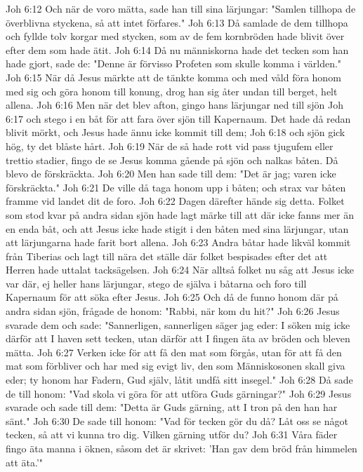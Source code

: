 Joh 6:12  Och när de voro mätta, sade han till sina lärjungar: "Samlen tillhopa de överblivna styckena, så att intet förfares."
Joh 6:13  Då samlade de dem tillhopa och fyllde tolv korgar med stycken, som av de fem kornbröden hade blivit över efter dem som hade ätit.
Joh 6:14  Då nu människorna hade det tecken som han hade gjort, sade de: "Denne är förvisso Profeten som skulle komma i världen."
Joh 6:15  När då Jesus märkte att de tänkte komma och med våld föra honom med sig och göra honom till konung, drog han sig åter undan till berget, helt allena.
Joh 6:16  Men när det blev afton, gingo hans lärjungar ned till sjön
Joh 6:17  och stego i en båt för att fara över sjön till Kapernaum. Det hade då redan blivit mörkt, och Jesus hade ännu icke kommit till dem;
Joh 6:18  och sjön gick hög, ty det blåste hårt.
Joh 6:19  När de så hade rott vid pass tjugufem eller trettio stadier, fingo de se Jesus komma gående på sjön och nalkas båten. Då blevo de förskräckta.
Joh 6:20  Men han sade till dem: "Det är jag; varen icke förskräckta."
Joh 6:21  De ville då taga honom upp i båten; och strax var båten framme vid landet dit de foro.
Joh 6:22  Dagen därefter hände sig detta. Folket som stod kvar på andra sidan sjön hade lagt märke till att där icke fanns mer än en enda båt, och att Jesus icke hade stigit i den båten med sina lärjungar, utan att lärjungarna hade farit bort allena.
Joh 6:23  Andra båtar hade likväl kommit från Tiberias och lagt till nära det ställe där folket bespisades efter det att Herren hade uttalat tacksägelsen.
Joh 6:24  När alltså folket nu såg att Jesus icke var där, ej heller hans lärjungar, stego de själva i båtarna och foro till Kapernaum för att söka efter Jesus.
Joh 6:25  Och då de funno honom där på andra sidan sjön, frågade de honom: "Rabbi, när kom du hit?"
Joh 6:26  Jesus svarade dem och sade: "Sannerligen, sannerligen säger jag eder: I söken mig icke därför att I haven sett tecken, utan därför att I fingen äta av bröden och bleven mätta.
Joh 6:27  Verken icke för att få den mat som förgås, utan för att få den mat som förbliver och har med sig evigt liv, den som Människosonen skall giva eder; ty honom har Fadern, Gud själv, låtit undfå sitt insegel."
Joh 6:28  Då sade de till honom: "Vad skola vi göra för att utföra Guds gärningar?"
Joh 6:29  Jesus svarade och sade till dem: "Detta är Guds gärning, att I tron på den han har sänt."
Joh 6:30  De sade till honom: "Vad för tecken gör du då? Låt oss se något tecken, så att vi kunna tro dig. Vilken gärning utför du?
Joh 6:31  Våra fäder fingo äta manna i öknen, såsom det är skrivet: 'Han gav dem bröd från himmelen att äta.'"
